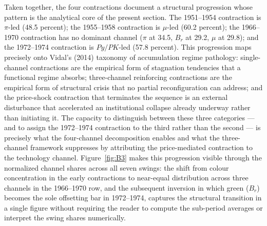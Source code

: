 
Taken together, the four contractions document a structural progression
whose pattern is the analytical core of the present section. The
1951--1954 contraction is $\pi$-led (48.5 percent); the 1955--1958
contraction is $\mu$-led (60.2 percent); the 1966--1970 contraction has
no dominant channel ($\pi$ at 34.5, $B_{r}$ at 29.2, $\mu$ at 29.8);
and the 1972--1974 contraction is $Py/PK$-led (57.8 percent). This
progression maps precisely onto Vidal's (2014) taxonomy of accumulation
regime pathology: single-channel contractions are the empirical form
of stagnation tendencies that a functional regime absorbs; three-channel
reinforcing contractions are the empirical form of structural crisis
that no partial reconfiguration can address; and the price-shock
contraction that terminates the sequence is an external disturbance
that accelerated an institutional collapse already underway rather than
initiating it. The capacity to distinguish between these three categories
--- and to assign the 1972--1974 contraction to the third rather than
the second --- is precisely what the four-channel decomposition enables
and what the three-channel framework suppresses by attributing the
price-mediated contraction to the technology channel. Figure~\ref{fig:B3}
makes this progression visible through the normalized channel shares
across all seven swings: the shift from colour concentration in the early
contractions to near-equal distribution across three channels in the
1966--1970 row, and the subsequent inversion in which green ($B_{r}$)
becomes the sole offsetting bar in 1972--1974, captures the structural
transition in a single figure without requiring the reader to compute
the sub-period averages or interpret the swing shares numerically.


